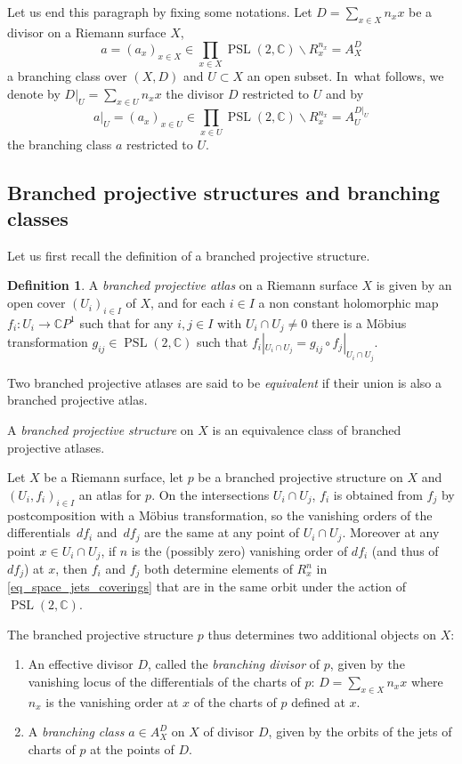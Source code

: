 \documentclass[JEP,XML,SOM,Unicode,NoEqCountersInSection,published]{cedram}
\newcommand{\C}{\mathbb C}
\newcommand{\CP}{\mathbb CP}
\DeclareMathOperator{\PSL}{PSL}
\theoremstyle{definition}
\newtheorem{definition}{Definition}[subsection]
\theoremstyle{plain}
\begin{document}
Let us end this paragraph by fixing some notations.
Let $D = \sum_{x \in X} n_x x$ be a divisor on a Riemann surface $X$,
\[
a = (a_x)_{x \in X} \in \prod_{x \in X} \PSL(2, \C) \backslash R_{x}^{n_x} = A_X^D
\]
a branching class over $(X, D)$ and $U \subset X$ an open subset. In~what follows, we denote by $D|_U = \sum_{x \in U} n_x x$ the divisor $D$ restricted to $U$ and by
\[
a|_U = (a_x)_{x \in U} \in \prod_{x \in U} \PSL(2, \C) \backslash R_{x}^{n_x} = A_U^{D|_U}
\]
the branching class $a$ restricted to $U$.

\subsection{Branched projective structures and branching classes}

Let us first recall the definition of a branched projective structure.

\begin{definition}
A \emph{branched projective atlas} on a Riemann surface $X$ is given by an open cover $(U_i)_{i \in I}$ of $X$, and for each $i \in I$ a non constant holomorphic map $f_i: U_i \to \CP^1$ such that for any $i, j \in I$ with $U_i \cap U_j \neq 0$ there is a Möbius transformation $g_{ij} \in \PSL(2, \C)$ such that $f_i|_{U_i \cap U_j} = g_{ij} \circ f_j|_{U_i \cap U_j}$.

Two branched projective atlases are said to be \emph{equivalent} if their union is also a branched projective atlas.

A \emph{branched projective structure} on $X$ is an equivalence class of branched projective atlases.
\end{definition}

Let $X$ be a Riemann surface, let $p$ be a branched projective structure on $X$ and $(U_i, f_i)_{i \in I}$ an atlas for $p$.
On the intersections $U_i \cap U_j$, $f_i$ is obtained from $f_j$ by postcomposition with a Möbius transformation, so the vanishing orders of the differentials~$df_i$ and~$df_j$ are the same at any point of $U_i \cap U_j$.
Moreover at any point $x \in U_i \cap U_j$, if $n$ is the (possibly zero) vanishing order of $df_i$ (and thus of $df_j$) at $x$, then $f_i$ and $f_j$ both determine elements of $R_x^n$ in \eqref{eq_space_jets_coverings} that are in the same orbit under the action of $\PSL(2, \C)$.

The branched projective structure $p$ thus determines two additional objects on $X$:
\begin{enumerate}
\item
An effective divisor $D$, called the \emph{branching divisor} of $p$, given by the vanishing locus of the differentials of the charts of $p$: $D = \sum_{x \in X} n_x x$ where $n_x$ is the vanishing order at $x$ of the charts of $p$ defined at $x$.
\item
A \emph{branching class} $a \in A_X^D$ on $X$ of divisor $D$, given by the orbits of the jets of charts of $p$ at the points of $D$.
\end{enumerate}
\end{document}
